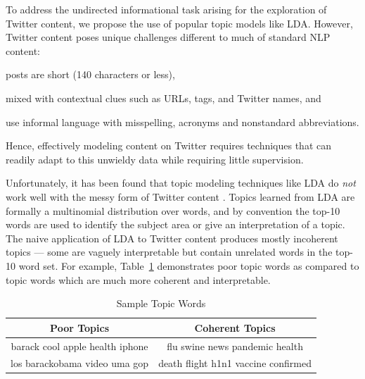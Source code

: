 \documentclass[10pt,a5paper,twoside]{article}
\begin{document}
To address the undirected informational task arising for the 
exploration of Twitter content, we propose the use of popular topic
models like LDA.  However, 
Twitter content poses unique challenges different to much of standard
NLP content: 
\begin{compactenum}
\item posts are short (140 characters or less),
\item mixed with contextual clues such as URLs, tags, and Twitter names, and
\item use informal language with misspelling, acronyms and 
nonstandard abbreviations.
\end{compactenum}
Hence, effectively modeling content on Twitter
requires techniques that can readily adapt to this unwieldy data while
requiring little supervision.  

Unfortunately, it has been found that topic modeling techniques like
LDA do \emph{not} work well with the messy form of Twitter content
\cite{wayne}.  Topics learned from LDA are formally a multinomial
distribution over words, and by convention the top-10 words are used
to identify the subject area or give an interpretation of a topic.
The naive application of LDA to Twitter content produces mostly
incoherent topics --- some are vaguely interpretable but contain
unrelated words in the top-10 word set.  For example,
Table~\ref{tbl-0} demonstrates poor topic words as compared to topic
words which are much more coherent and interpretable.

\begin{table}[!h]
\centering
{
	\begin{tabular}{|c|c|}
	\hline
        Poor Topics  & Coherent Topics \\
\hline
 {\small barack cool apple health iphone}
 &
 {\small flu swine news pandemic health}\\
 {\small los barackobama video uma gop} & {\small death flight h1n1 vaccine confirmed} \\
 \hline
	\end{tabular}
}
\caption{Sample Topic Words}\label{tbl-0}
\end{table}
\end{document}
